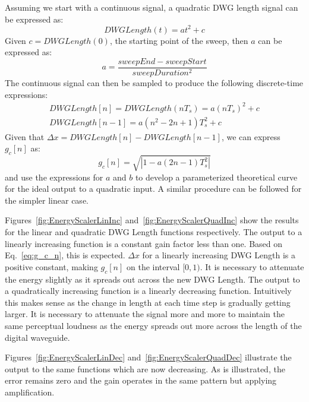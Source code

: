 \documentclass[../main.tex]{subfiles}
\begin{document}
Assuming we start with a continuous signal, a quadratic DWG length signal can be expressed as:
\begin{equation}
    DWGLength(t) = at^2 + c 
\end{equation}
Given $c = DWGLength(0)$,  the starting point of the sweep, then $a$ can be expressed as:
\begin{equation}
    a = \frac{sweepEnd - sweepStart}{sweepDuration^2}
\end{equation}
The continuous signal can then be sampled to produce the following discrete-time expressions:
\begin{align}
    DWGLength[n] = DWGLength(nT_s) = a(nT_s)^2 + c\\
    DWGLength[n-1] = a(n^2 - 2n + 1)T_s^2 + c
\end{align}
Given that $\Delta x = DWGLength[n] - DWGLength[n-1]$, we can express $g_c[n]$ as:
\begin{equation}
    g_c[n] = \sqrt{|1-a(2n-1)T_s^2|}
\end{equation}
and use the expressions for $a$ and $b$ to develop a parameterized theoretical curve for the ideal output to a quadratic input. A similar procedure can be followed for the simpler linear case.

Figures~\ref{fig:EnergyScalerLinInc} and~\ref{fig:EnergyScalerQuadInc} show the results for the linear and quadratic DWG Length functions respectively. The output to a linearly increasing function is a constant gain factor less than one. Based on Eq.~\ref{eq:g_c_n}, this is expected. $\Delta x$ for a linearly increasing DWG Length is a positive constant, making $g_c[n]$ on the interval $[0, 1)$. It is necessary to attenuate the energy slightly as it spreads out across the new DWG Length. The output to a quadratically increasing function is a linearly decreasing function. Intuitively this makes sense as the change in length at each time step is gradually getting larger. It is necessary to attenuate the signal more and more to maintain the same perceptual loudness as the energy spreads out more across the length of the digital waveguide. 

Figures~\ref{fig:EnergyScalerLinDec} and~\ref{fig:EnergyScalerQuadDec} illustrate the output to the same functions which are now decreasing. As is illustrated, the error remains zero and the gain operates in the same pattern but applying amplification.
\end{document}
